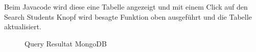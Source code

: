 \newpage
\noindent
Beim Javacode wird diese eine Tabelle angezeigt und mit einem Click auf den
Search Students Knopf wird besagte Funktion oben ausgeführt und die Tabelle
aktualisiert.
\begin{figure}[h]
	\centering
	\caption{Query Resultat MongoDB}
	\label{fig:monogdbres}
\end{figure}
